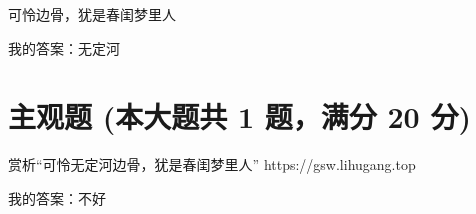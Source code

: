 \documentclass[12pt, a4paper, addpoints]{exam}
\begin{document}
\begin{questions}
\question[20] 可怜\uline{\qquad\qquad\qquad}边骨，犹是春闺梦里人

我的答案：无定河

\end{questions}

\hspace{5cm}

\section{\normalsize{主观题 (本大题共 1 题，满分 20 分)}}
\hspace{1.5cm}

\begin{questions}
\question[20] 赏析“可怜无定河边骨，犹是春闺梦里人”
https://gsw.lihugang.top


我的答案：不好

\end{questions}
\end{document}
